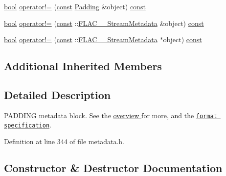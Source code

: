 {\bf }\par
\begin{DoxyCompactItemize}
\item 
\hyperlink{mac_2config_2i386_2lib-src_2libsoxr_2soxr-config_8h_abb452686968e48b67397da5f97445f5b}{bool} \hyperlink{class_f_l_a_c_1_1_metadata_1_1_padding_a21d2734b6dc97e537806eef07f0db5be}{operator!=} (\hyperlink{getopt1_8c_a2c212835823e3c54a8ab6d95c652660e}{const} \hyperlink{class_f_l_a_c_1_1_metadata_1_1_padding}{Padding} \&object) \hyperlink{getopt1_8c_a2c212835823e3c54a8ab6d95c652660e}{const} 
\item 
\hyperlink{mac_2config_2i386_2lib-src_2libsoxr_2soxr-config_8h_abb452686968e48b67397da5f97445f5b}{bool} \hyperlink{class_f_l_a_c_1_1_metadata_1_1_padding_ad12b6548ce88c8789a90d2c24c40f3cc}{operator!=} (\hyperlink{getopt1_8c_a2c212835823e3c54a8ab6d95c652660e}{const} \+::\hyperlink{struct_f_l_a_c_____stream_metadata}{F\+L\+A\+C\+\_\+\+\_\+\+Stream\+Metadata} \&object) \hyperlink{getopt1_8c_a2c212835823e3c54a8ab6d95c652660e}{const} 
\item 
\hyperlink{mac_2config_2i386_2lib-src_2libsoxr_2soxr-config_8h_abb452686968e48b67397da5f97445f5b}{bool} \hyperlink{class_f_l_a_c_1_1_metadata_1_1_padding_a15aadefaa426aa8b7a952f6a61c4c3b5}{operator!=} (\hyperlink{getopt1_8c_a2c212835823e3c54a8ab6d95c652660e}{const} \+::\hyperlink{struct_f_l_a_c_____stream_metadata}{F\+L\+A\+C\+\_\+\+\_\+\+Stream\+Metadata} $\ast$object) \hyperlink{getopt1_8c_a2c212835823e3c54a8ab6d95c652660e}{const} 
\end{DoxyCompactItemize}

\subsection*{Additional Inherited Members}


\subsection{Detailed Description}
P\+A\+D\+D\+I\+NG metadata block. See the \hyperlink{group__flacpp__metadata__object}{overview } for more, and the \href{../format.html#metadata_block_padding}{\tt format specification}. 

Definition at line 344 of file metadata.\+h.



\subsection{Constructor \& Destructor Documentation}

